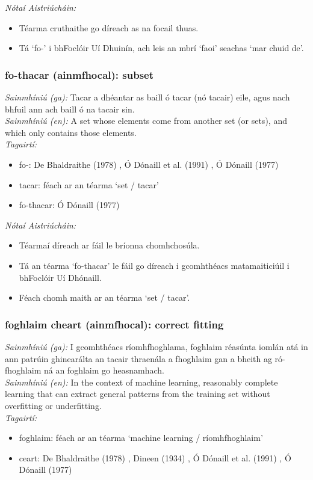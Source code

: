  \noindent \textit{Nótaí Aistriúcháin:}
\begin{itemize}
	\item Téarma cruthaithe go díreach as na focail thuas.
	\item Tá `fo-' i bhFoclóir Uí Dhuinín, ach leis an mbrí `faoi' seachas `mar chuid de'.
\end{itemize}


\subsubsection*{fo-thacar (ainmfhocal): subset}
 \noindent \textit{Sainmhíniú (ga):} Tacar a dhéantar as baill ó tacar (nó tacair) eile, agus nach bhfuil ann ach baill ó na tacair sin.
\\
 \noindent \textit{Sainmhíniú (en):} A set whose elements come from another set (or sets), and which only contains those elements.
\\
 \noindent \textit{Tagairtí:}
\begin{itemize}
	\item fo-: De Bhaldraithe (1978) \cite{de-bhaldraithe}, Ó Dónaill et al. (1991) \cite{focloir-beag}, Ó Dónaill (1977) \cite{odonaill}
	\item tacar: féach ar an téarma `set / tacar'
	\item fo-thacar: Ó Dónaill (1977) \cite{odonaill}
\end{itemize}

 \noindent \textit{Nótaí Aistriúcháin:}
\begin{itemize}
	\item Téarmaí díreach ar fáil le bríonna chomhchosúla.
	\item Tá an téarma `fo-thacar' le fáil go díreach i gcomhthéacs matamaiticiúil i bhFoclóir Uí Dhónaill.
	\item Féach chomh maith ar an téarma `set / tacar'.
\end{itemize}


\subsubsection*{foghlaim cheart (ainmfhocal): correct fitting}
 \noindent \textit{Sainmhíniú (ga):} I gcomhthéacs ríomhfhoghlama, foghlaim réasúnta iomlán atá in ann patrúin ghinearálta an tacair thraenála a fhoghlaim gan a bheith ag ró-fhoghlaim ná an foghlaim go heasnamhach.
\\
 \noindent \textit{Sainmhíniú (en):} In the context of machine learning, reasonably complete learning that can extract general patterns from the training set without overfitting or underfitting.
\\
 \noindent \textit{Tagairtí:}
\begin{itemize}
	\item foghlaim: féach ar an téarma `machine learning / ríomhfhoghlaim'
	\item ceart: De Bhaldraithe (1978) \cite{de-bhaldraithe}, Dineen (1934) \cite{dineen}, Ó Dónaill et al. (1991) \cite{focloir-beag}, Ó Dónaill (1977) \cite{odonaill}
\end{itemize}

